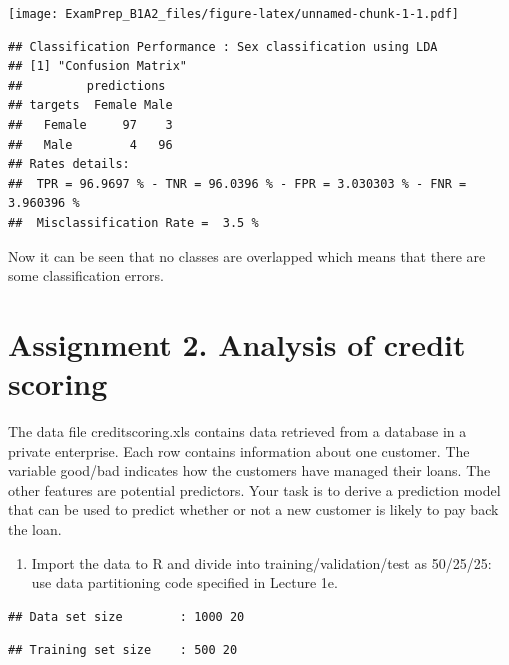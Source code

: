 \documentclass[
]{article}
\newenvironment{Shaded}{\begin{snugshade}}{\end{snugshade}}
\newcommand{\KeywordTok}[1]{\textcolor[rgb]{0.13,0.29,0.53}{\textbf{#1}}}
\newcommand{\NormalTok}[1]{#1}
\newcommand{\OperatorTok}[1]{\textcolor[rgb]{0.81,0.36,0.00}{\textbf{#1}}}
\newcommand{\StringTok}[1]{\textcolor[rgb]{0.31,0.60,0.02}{#1}}
\providecommand{\tightlist}{%
  \setlength{\itemsep}{0pt}\setlength{\parskip}{0pt}}
\begin{document}
\texttt{[image: ExamPrep\_B1A2\_files/figure-latex/unnamed-chunk-1-1.pdf]}

\begin{Shaded}
\end{Shaded}

\begin{verbatim}
## Classification Performance : Sex classification using LDA 
## [1] "Confusion Matrix"
##         predictions
## targets  Female Male
##   Female     97    3
##   Male        4   96
## Rates details:
##  TPR = 96.9697 % - TNR = 96.0396 % - FPR = 3.030303 % - FNR = 3.960396 %
##  Misclassification Rate =  3.5 %
\end{verbatim}

Now it can be seen that no classes are overlapped which means that there
are some classification errors.

\hypertarget{assignment-2.-analysis-of-credit-scoring}{%
\section{Assignment 2. Analysis of credit
scoring}\label{assignment-2.-analysis-of-credit-scoring}}

The data file creditscoring.xls contains data retrieved from a database
in a private enterprise. Each row contains information about one
customer. The variable good/bad indicates how the customers have managed
their loans. The other features are potential predictors. Your task is
to derive a prediction model that can be used to predict whether or not
a new customer is likely to pay back the loan.

\begin{enumerate}
\def\labelenumi{\arabic{enumi}.}
\tightlist
\item
  Import the data to R and divide into training/validation/test as
  50/25/25: use data partitioning code specified in Lecture 1e.
\end{enumerate}

\begin{verbatim}
## Data set size        : 1000 20
\end{verbatim}

\begin{verbatim}
## Training set size    : 500 20
\end{verbatim}
\end{document}
